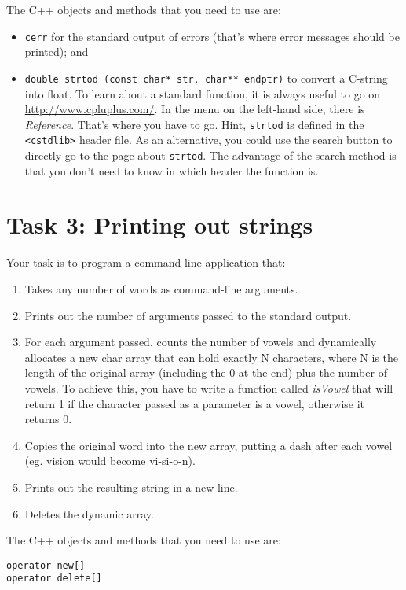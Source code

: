 The C++ objects and methods that you need to use are:
\begin{itemize}
\item \verb+cerr+ for the standard output of errors (that's where error messages should be printed); and 
\item \verb+double strtod (const char* str, char** endptr)+ to convert a C-string into float. To learn about a standard function, it is always useful to go on \url{http://www.cpluplus.com/}. In the menu on the left-hand side, there is \emph{Reference}. That's where you have to go. Hint, \verb+strtod+ is defined in the \verb+<cstdlib>+ header file. As an alternative, you could use the search button to directly go to the page about \verb+strtod+. The advantage of the search method is that you don't need to know in which header the function is.
\end{itemize}

\section*{Task 3: Printing out strings}

Your task is to program a command-line application that:
\begin{enumerate}
	\item Takes any number of words as command-line arguments.
	\item Prints out the number of arguments passed to the standard output.
	\item For each argument passed, counts the number of vowels and dynamically allocates a new char array that can hold
		  exactly N characters, where N is the length of the original array (including the 0 at the end) plus the number of vowels.
		  To achieve this, you have to write a function called \emph{isVowel} that will return 1 if the character passed as a parameter
		  is a vowel, otherwise it returns 0.
	\item Copies the original word into the new array, putting a dash after each vowel (eg. vision would become vi-si-o-n).
	\item Prints out the resulting string in a new line.
	\item Deletes the dynamic array.
\end{enumerate}

The C++ objects and methods that you need to use are:
\begin{verbatim}
operator new[]
operator delete[]
\end{verbatim}


